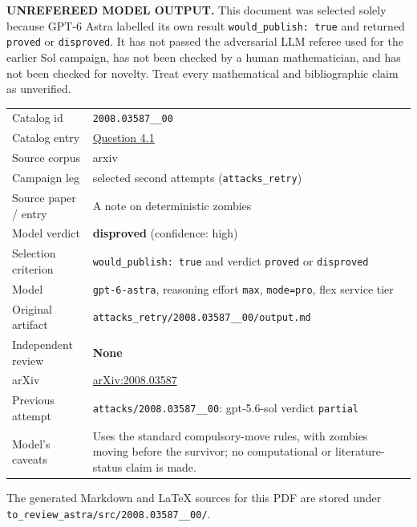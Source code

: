 \documentclass[
  11pt,
  a4paper,
]{article}
\newcounter{none} %
\begin{document}
\begin{warning}

\textbf{UNREFEREED MODEL OUTPUT.} This document was selected solely
because GPT-6 Astra labelled its own result
\texttt{would\_publish:\ true} and returned \texttt{proved} or
\texttt{disproved}. It has not passed the adversarial LLM referee used
for the earlier Sol campaign, has not been checked by a human
mathematician, and has not been checked for novelty. Treat every
mathematical and bibliographic claim as unverified.

\end{warning}

{\def\LTcaptype{none} %
\begin{longtable}[]{@{}
  >{\raggedright\arraybackslash}p{}
  >{\raggedright\arraybackslash}p{}@{}}
\toprule\noalign{}
\endhead
\bottomrule\noalign{}
\endlastfoot
Catalog id & \texttt{2008.03587\_\_00} \\
Catalog entry &
\href{https://graph-theory-ai.github.io/graph-conjectures/arxiv/2008.03587__00/}{Question
4.1} \\
Source corpus & arxiv \\
Campaign leg & selected second attempts (\texttt{attacks\_retry}) \\
Source paper / entry & A note on deterministic zombies \\
Model verdict & \textbf{disproved} (confidence: high) \\
Selection criterion & \texttt{would\_publish:\ true} and verdict
\texttt{proved} or \texttt{disproved} \\
Model & \texttt{gpt-6-astra}, reasoning effort \texttt{max},
\texttt{mode=pro}, flex service tier \\
Original artifact &
\texttt{attacks\_retry/2008.03587\_\_00/output.md} \\
Independent review & \textbf{None} \\
arXiv & \href{https://arxiv.org/abs/2008.03587}{arXiv:2008.03587} \\
Previous attempt & \texttt{attacks/2008.03587\_\_00}: gpt-5.6-sol
verdict \texttt{partial} \\
Model's caveats & Uses the standard compulsory-move rules, with zombies
moving before the survivor; no computational or literature-status claim
is made. \\
\end{longtable}
}

The generated Markdown and LaTeX sources for this PDF are stored under
\texttt{to\_review\_astra/src/2008.03587\_\_00/}.
\end{document}
